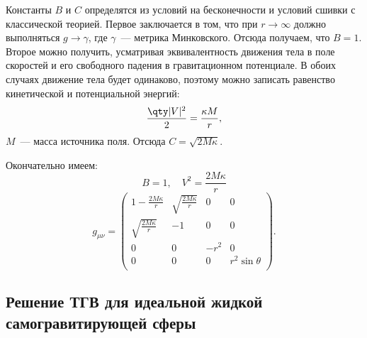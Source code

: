 \documentclass[\docroot/reports/draft/report.tex]{subfiles}
\begin{document}
    Константы $B$ и $C$ определятся из условий на бесконечности и условий сшивки с классической теорией. Первое заключается в том, что при $r \to \infty$ должно выполняться $g \to \gamma$, где $\gamma$~--- метрика Минковского. Отсюда получаем, что $B = 1$. Второе можно получить, усматривая эквивалентность движения тела в поле скоростей и его свободного падения в гравитационном потенциале. В обоих случаях движение тела будет одинаково, поэтому можно записать равенство кинетической и потенциальной энергий:
    \begin{equation*}
        \frac{\qty|V|^2}{2} = \frac{\kappa M}{r} ,
    \end{equation*}
    $M$~--- масса источника поля. Отсюда $C = \sqrt{2 M \kappa}$.

    Окончательно имеем:
    \begin{equation*}
        B = 1, \quad V^2 = \frac{2 M \kappa}{r}
    \end{equation*}
    \begin{equation*}
        g_{\mu\nu} = \begin{pmatrix}
            1 - \frac{2 M \kappa}{r} & \sqrt{\frac{2 M \kappa}{r}} & 0 & 0 \\
            \sqrt{\frac{2 M \kappa}{r}} & -1 & 0 & 0 \\
            0 & 0 & -r^2 & 0 \\
            0 & 0 & 0 & r^2 \sin\theta \\
        \end{pmatrix} .
    \end{equation*}

\subsection{Решение ТГВ для идеальной жидкой самогравитирующей сферы}



\end{document}
